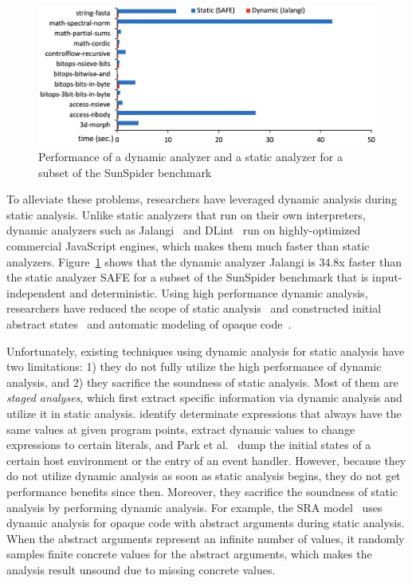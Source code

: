 \begin{figure}[t]
  \centering
  \includegraphics[width=\linewidth]{../img/performance_v8v7}
  \vspace*{-2em}
  \caption{Performance of a dynamic analyzer and a static analyzer for a subset
  of the SunSpider benchmark}
  \label{fig:performance}
  \vspace*{-1em}
\end{figure}

To alleviate these problems, researchers have leveraged
dynamic analysis during static analysis.  Unlike static analyzers that
run on their own interpreters, dynamic analyzers such as Jalangi~\cite{jalangi} and DLint~\cite{dlint}
run on highly-optimized commercial JavaScript engines, which makes them
much faster than static analyzers.
Figure~\ref{fig:performance} shows that the dynamic analyzer
Jalangi is 34.8x faster than the static analyzer SAFE for a subset of the
SunSpider benchmark that is input-independent and deterministic.
Using high performance dynamic analysis, researchers have
reduced the scope of static analysis~\cite{determinacy, blendedJS} and constructed
initial abstract states~\cite{battles, eha} and automatic modeling of opaque
code~\cite{sra}.

Unfortunately, existing techniques using dynamic analysis for static analysis
have two limitations: 1) they do not fully utilize the high performance of dynamic
analysis, and 2) they sacrifice the soundness of static analysis.  Most of
them are \textit{staged analyses}, which first extract specific
information via dynamic analysis and utilize it in static analysis.
\citet{determinacy} identify determinate expressions that always have the same
values at given program points, \citet{blendedJS} extract dynamic values to
change expressions to certain literals, and Park et al.~\cite{battles,eha} dump
the initial states of a certain host environment or the entry of an event handler.
However, because they do not utilize dynamic analysis as soon as static
analysis begins, they do not get performance benefits since then.  Moreover,
they sacrifice the soundness of static analysis by performing dynamic analysis.
For example, the SRA model~\cite{sra} uses dynamic analysis for opaque code
with abstract arguments during static analysis.  When the abstract arguments
represent an infinite number of values, it randomly samples finite
concrete values for the abstract arguments, which makes the analysis
result unsound due to missing concrete values.

